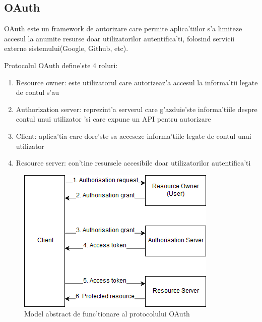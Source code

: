 \documentclass[12pt,a4paper,twoside]{report}
\begin{document}
\subsection{OAuth}
OAuth este un framework de autorizare care permite aplica'tiilor s'a limiteze accesul la anumite resurse doar utilizatorilor autentifica'ti, folosind servicii externe sistemului(Google, Github, etc). 

Protocolul OAuth define'ste 4 roluri:
\begin{enumerate}
    \item Resource owner: este utilizatorul care autorizeaz'a accesul la informa'tii legate de contul s'au
    \item Authorization  server: reprezint'a serverul care g'azduie'ste informa'tiile despre contul unui utilizator 'si care expune un API pentru autorizare
    \item Client: aplica'tia care dore'ste sa acceseze informa'tiile legate de contul unui utilizator
    \item Resource server: con'tine resursele accesibile doar utilizatorilor autentifica'ti
\end{enumerate}

	\begin{figure}[H]
		\begin{center}
			\includegraphics[scale=0.50]{img/oauth.png}
			\caption{Model abstract de func'tionare al protocolului OAuth\cite{oauth}}
  			\label{fig:oauth}
  		\end{center}
  		\end{figure}
  		
\end{document}
